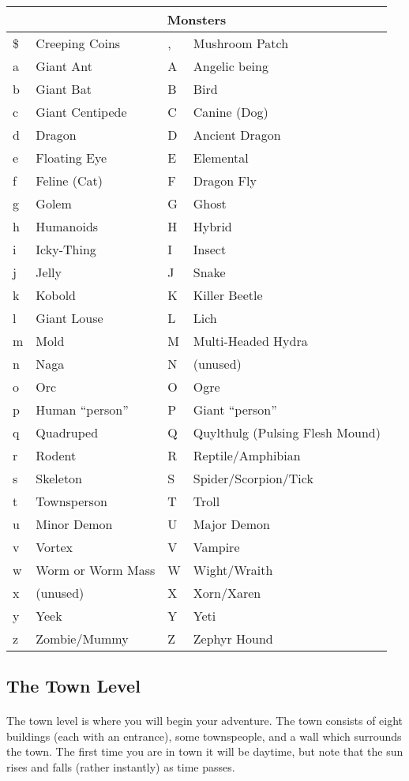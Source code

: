\paragraph{}
\begin{tabular}{|ll|ll|}
\hline
\multicolumn{4}{|c|}{Monsters}\\
\hline
\$&Creeping Coins&,&Mushroom Patch\\
a&Giant Ant&A&Angelic being\\
b&Giant Bat&B&Bird\\
c&Giant Centipede&C&Canine (Dog)\\
d&Dragon&D&Ancient Dragon\\
e&Floating Eye&E&Elemental\\
f&Feline (Cat)&F&Dragon Fly\\
g&Golem&G&Ghost\\
h&Humanoids&H&Hybrid\\
i&Icky-Thing&I&Insect\\
j&Jelly&J&Snake\\
k&Kobold&K&Killer Beetle\\
l&Giant Louse&L&Lich\\
m&Mold&M&Multi-Headed Hydra\\
n&Naga&N&(unused)\\
o&Orc&O&Ogre\\
p&Human ``person''&P&Giant ``person''\\
q&Quadruped&Q&Quylthulg (Pulsing Flesh Mound)\\
r&Rodent&R&Reptile/Amphibian\\
s&Skeleton&S&Spider/Scorpion/Tick\\
t&Townsperson&T&Troll\\
u&Minor Demon&U&Major Demon\\
v&Vortex&V&Vampire\\
w&Worm or Worm Mass&W&Wight/Wraith\\
x&(unused)&X&Xorn/Xaren\\
y&Yeek&Y&Yeti\\
z&Zombie/Mummy&Z&Zephyr Hound\\
\hline
\end{tabular}

\subsection{The Town Level}
\paragraph{}The town level is where you will begin your adventure. The
town consists of eight buildings (each with an entrance), some
townspeople, and a wall which surrounds the town. The first time you are
in town it will be daytime, but note that the sun rises and falls
(rather instantly) as time passes.



